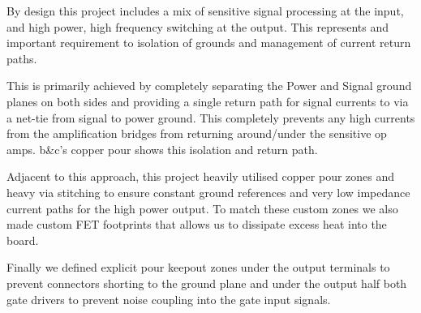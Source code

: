 \documentclass[11pt]{article}
\begin{document}
{By design this project includes a mix of sensitive signal processing at the input, and high power, high frequency switching at the output. This represents and important requirement to isolation of grounds and management of current return paths.

This is primarily achieved by completely separating the Power and Signal ground planes on both sides and providing a single return path for signal currents to  via a net-tie from signal to power ground. This completely prevents any high currents from the amplification bridges from returning around/under the sensitive op amps.  b\&c's copper pour shows this isolation and return path.

Adjacent to this approach, this project heavily utilised copper pour zones and heavy via stitching to ensure constant ground references and very low impedance current paths for the high power output. To match these custom zones we also made custom FET footprints that allows us to dissipate excess heat into the board.

Finally we defined explicit pour keepout zones under the output terminals to prevent connectors shorting to the ground plane and under the output half both gate drivers to prevent noise coupling into the gate input signals.

}
\end{document}
